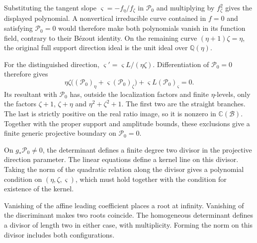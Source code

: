 \documentclass[11pt,a4paper]{article}
\numberwithin{equation}{section}
\theoremstyle{plain}
\theoremstyle{definition}
\theoremstyle{remark}
\begin{document}
Substituting the tangent slope
$\varsigma=-f_\eta/f_\zeta$ in $\mathcal P_0$ and multiplying
by $f_\zeta^2$ gives the displayed polynomial. A nonvertical
irreducible curve contained in $f=0$ and satisfying
$\mathcal P_0=0$ would therefore make both polynomials vanish
in its function field, contrary to their B\'ezout identity.
On the remaining curve $(\eta+1)\zeta=\eta$, the original
full support direction ideal is the unit ideal over
$\mathbb Q(\eta)$.

For the distinguished direction,
$\varsigma'=\varsigma L/(\eta\zeta)$. Differentiation of
$\mathcal P_0=0$ therefore gives
\[
 \eta\zeta\bigl((\mathcal P_0)_\eta+
       \varsigma(\mathcal P_0)_\zeta\bigr)
       +\varsigma L(\mathcal P_0)_\varsigma=0.
\]
Its resultant with $\mathcal P_0$ has, outside the localization
factors and finite $\eta$-levels, only the factors
$\zeta+1$, $\zeta+\eta$ and $\eta^2+\zeta^2+1$.
The first two are the straight branches. The last is strictly
positive on the real ratio image, so it is nonzero in
$\mathbb C(\mathscr B)$. Together with the proper support and
amplitude bounds, these exclusions give a finite generic
projective boundary on $\mathcal P_0=0$.

On $g_*\mathcal P_0\ne0$, the determinant defines a finite degree
two divisor in the projective direction parameter. The linear
equations define a kernel line on this divisor. Taking the norm of
the quadratic relation along the divisor gives a polynomial
condition on $(\eta,\zeta,\varsigma)$, which must hold together
with the condition for existence of the kernel.

Vanishing of the affine leading coefficient places a root at
infinity. Vanishing of the discriminant makes two roots
coincide. The homogeneous determinant defines a divisor of
length two in either case, with multiplicity. Forming the norm
on this divisor includes both configurations.
\end{document}
